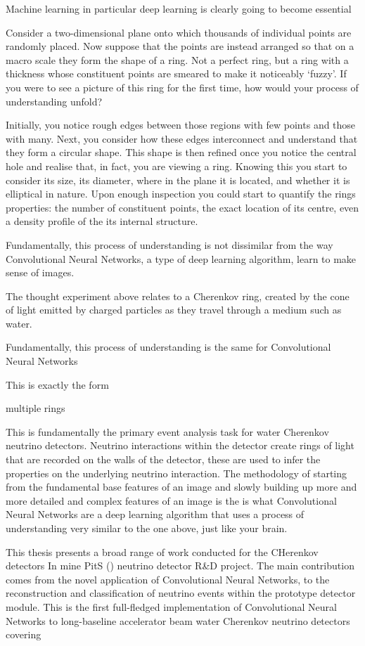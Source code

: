 Machine learning in particular deep learning is clearly going to become essential 

Consider a two-dimensional plane onto which thousands of individual points are randomly placed.
Now suppose that the points are instead arranged so that on a macro scale they form the shape of a
ring. Not a perfect ring, but a ring with a thickness whose constituent points are smeared to make
it noticeably `fuzzy'. If you were to see a picture of this ring for the first time, how would
your process of understanding unfold?

Initially, you notice rough edges between those regions with few points and those with many. Next,
you consider how these edges interconnect and understand that they form a circular shape. This
shape is then refined once you notice the central hole and realise that, in fact, you are viewing
a ring. Knowing this you start to consider its size, its diameter, where in the plane it is
located, and whether it is elliptical in nature. Upon enough inspection you could start to
quantify the rings properties: the number of constituent points, the exact location of its centre,
even a density profile of the its internal structure.

Fundamentally, this process of understanding is not dissimilar from the way Convolutional Neural
Networks, a type of deep learning algorithm, learn to make sense of images. 

The thought experiment above relates to a Cherenkov ring, created by the cone of light emitted by
charged particles as they travel through a medium such as water.

Fundamentally, this process of understanding is the same for Convolutional Neural Networks

This is exactly the form 

multiple rings

This is fundamentally the primary event analysis task for water Cherenkov neutrino detectors.
Neutrino interactions within the detector create rings of light that are recorded on the walls of
the detector, these are used to infer the properties on the underlying neutrino interaction. The
methodology of starting from the fundamental base features of an image and slowly building up more
and more detailed and complex features of an image is the is what Convolutional Neural Networks
are a deep learning algorithm that uses a process of understanding very similar to the one above,
just like your brain. 

This thesis presents a broad range of work conducted for the CHerenkov detectors In mine PitS
(\chips) neutrino detector R\&D project. The main contribution comes from the novel application of
Convolutional Neural Networks, to the reconstruction and classification of neutrino events within
the \chipsfive prototype detector module. This is the first full-fledged implementation of
Convolutional Neural Networks to long-baseline accelerator beam water Cherenkov neutrino detectors
covering 

